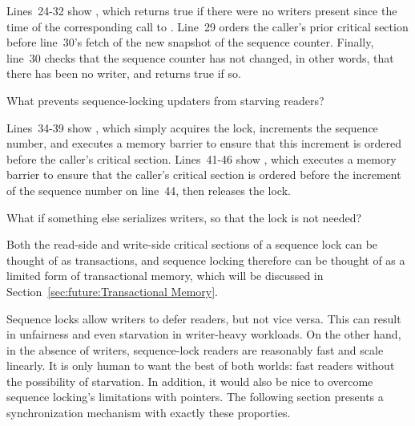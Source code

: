 Lines~24-32 show , which returns true if there
were no writers present since the time of the corresponding
call to .
Line~29 orders the caller's prior critical section before line~30's
fetch of the new snapshot of the sequence counter.
Finally, line~30 checks that the sequence counter has not changed,
in other words, that there has been no writer, and returns true if so.

\QuickQuiz{}
	What prevents sequence-locking updaters from starving readers?
 \QuickQuizEnd

Lines~34-39 show , which simply acquires the lock,
increments the sequence number, and executes a memory barrier to ensure
that this increment is ordered before the caller's critical section.
Lines~41-46 show , which executes a memory barrier
to ensure that the caller's critical section is ordered before the
increment of the sequence number on line~44, then releases the lock.

\QuickQuiz{}
	What if something else serializes writers, so that the lock
	is not needed?
 \QuickQuizEnd

Both the read-side and write-side critical sections of a sequence lock
can be thought of as transactions, and sequence locking therefore
can be thought of as a limited form of transactional memory, which
will be discussed in Section~\ref{sec:future:Transactional Memory}.

Sequence locks allow writers to defer readers, but not vice versa.
This can result in unfairness and even starvation
in writer-heavy workloads.
On the other hand, in the absence of writers, sequence-lock readers are
reasonably fast and scale linearly.
It is only human to want the best of both worlds: fast readers without
the possibility of starvation.
In addition, it would also be nice to overcome sequence locking's limitations
with pointers.
The following section presents a synchronization mechanism with exactly
these proporties.
